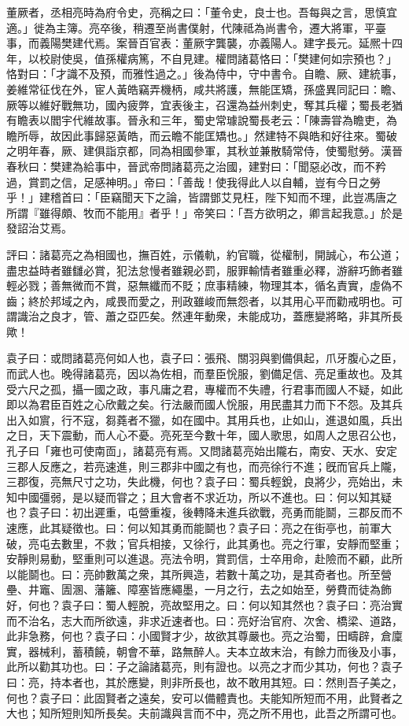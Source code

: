 \begin{pinyinscope}
董厥者，丞相亮時為府令史，亮稱之曰：「董令史，良士也。吾每與之言，思慎宜適。」徙為主簿。亮卒後，稍遷至尚書僕射，代陳祗為尚書令，遷大將軍，平臺事，而義陽樊建代焉。案晉百官表：董厥字龔襲，亦義陽人。建字長元。延熈十四年，以校尉使吳，值孫權病篤，不自見建。權問諸葛恪曰：「樊建何如宗預也？」恪對曰：「才識不及預，而雅性過之。」後為侍中，守中書令。自瞻、厥、建統事，姜維常征伐在外，宦人黃皓竊弄機柄，咸共將護，無能匡矯，孫盛異同記曰：瞻、厥等以維好戰無功，國內疲弊，宜表後主，召還為益州刺史，奪其兵權；蜀長老猶有瞻表以閻宇代維故事。晉永和三年，蜀史常璩說蜀長老云：「陳壽甞為瞻吏，為瞻所辱，故因此事歸惡黃皓，而云瞻不能匡矯也。」然建特不與皓和好往來。蜀破之明年春，厥、建俱詣京都，同為相國參軍，其秋並兼散騎常侍，使蜀慰勞。漢晉春秋曰：樊建為給事中，晉武帝問諸葛亮之治國，建對曰：「聞惡必改，而不矜過，賞罰之信，足感神明。」帝曰：「善哉！使我得此人以自輔，豈有今日之勞乎！」建稽首曰：「臣竊聞天下之論，皆謂鄧艾見枉，陛下知而不理，此豈馮唐之所謂『雖得頗、牧而不能用』者乎！」帝笑曰：「吾方欲明之，卿言起我意。」於是發詔治艾焉。

評曰：諸葛亮之為相國也，撫百姓，示儀軌，約官職，從權制，開誠心，布公道；盡忠益時者雖讎必賞，犯法怠慢者雖親必罰，服罪輸情者雖重必釋，游辭巧飾者雖輕必戮；善無微而不賞，惡無纖而不貶；庶事精練，物理其本，循名責實，虛偽不齒；終於邦域之內，咸畏而愛之，刑政雖峻而無怨者，以其用心平而勸戒明也。可謂識治之良才，管、蕭之亞匹矣。然連年動衆，未能成功，蓋應變將略，非其所長歟！

袁子曰：或問諸葛亮何如人也，袁子曰：張飛、關羽與劉備俱起，爪牙腹心之臣，而武人也。晚得諸葛亮，因以為佐相，而羣臣恱服，劉備足信、亮足重故也。及其受六尺之孤，攝一國之政，事凡庸之君，專權而不失禮，行君事而國人不疑，如此即以為君臣百姓之心欣戴之矣。行法嚴而國人恱服，用民盡其力而下不怨。及其兵出入如賔，行不寇，芻蕘者不獵，如在國中。其用兵也，止如山，進退如風，兵出之日，天下震動，而人心不憂。亮死至今數十年，國人歌思，如周人之思召公也，孔子曰「雍也可使南靣」，諸葛亮有焉。又問諸葛亮始出隴右，南安、天水、安定三郡人反應之，若亮速進，則三郡非中國之有也，而亮徐行不進；旣而官兵上隴，三郡復，亮無尺寸之功，失此機，何也？袁子曰：蜀兵輕銳，良將少，亮始出，未知中國彊弱，是以疑而甞之；且大會者不求近功，所以不進也。曰：何以知其疑也？袁子曰：初出遲重，屯營重複，後轉降未進兵欲戰，亮勇而能鬬，三郡反而不速應，此其疑徵也。曰：何以知其勇而能鬬也？袁子曰：亮之在街亭也，前軍大破，亮屯去數里，不救；官兵相接，又徐行，此其勇也。亮之行軍，安靜而堅重；安靜則易動，堅重則可以進退。亮法令明，賞罰信，士卒用命，赴險而不顧，此所以能鬬也。曰：亮帥數萬之衆，其所興造，若數十萬之功，是其奇者也。所至營壘、井竈、圊溷、藩籬、障塞皆應繩墨，一月之行，去之如始至，勞費而徒為飾好，何也？袁子曰：蜀人輕脫，亮故堅用之。曰：何以知其然也？袁子曰：亮治實而不治名，志大而所欲遠，非求近速者也。曰：亮好治官府、次舍、橋梁、道路，此非急務，何也？袁子曰：小國賢才少，故欲其尊嚴也。亮之治蜀，田疇辟，倉廩實，器械利，蓄積饒，朝會不華，路無醉人。夫本立故末治，有餘力而後及小事，此所以勸其功也。曰：子之論諸葛亮，則有證也。以亮之才而少其功，何也？袁子曰：亮，持本者也，其於應變，則非所長也，故不敢用其短。曰：然則吾子美之，何也？袁子曰：此固賢者之遠矣，安可以備體責也。夫能知所短而不用，此賢者之大也；知所短則知所長矣。夫前識與言而不中，亮之所不用也，此吾之所謂可也。


\end{pinyinscope}
